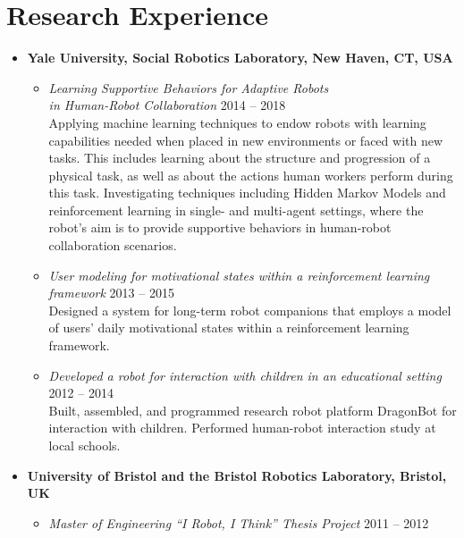 \documentclass[10pt,letterpaper]{article}
\newcommand{\thing}[2]{{#1} \hfill {#2}}
\begin{document}
\section{Research Experience}
\begin{itemize}%
\item {\bf Yale University, Social Robotics Laboratory, New Haven, CT, USA}\\
	\begin{itemize}\setlength\itemsep{0.8em}\vspace{-1em}
	\item \thing{\it Learning Supportive Behaviors for Adaptive Robots \\ in Human-Robot Collaboration}{2014 -- 2018}\vspace{0.1em}\\
	Applying machine learning techniques to endow robots with learning capabilities needed when placed in new environments or faced with new tasks. This includes learning about the structure and progression of a physical task, as well as about the actions human workers perform during this task. Investigating techniques including Hidden Markov Models and reinforcement learning in single- and multi-agent settings, where the robot's aim is to provide supportive behaviors in human-robot collaboration scenarios.
	\item \thing{\it User modeling for motivational states within a reinforcement learning framework}{2013 -- 2015}\vspace{0.1em}\\
	Designed a system for long-term robot companions that employs a model of users' daily motivational states within a reinforcement learning framework.
	\item \thing{\it Developed a robot for interaction with children in an educational setting}{2012 -- 2014}\vspace{0.1em}\\
	 Built, assembled, and programmed research robot platform DragonBot for interaction with children. Performed human-robot interaction study at local schools.
	\end{itemize}
\item {\bf University of Bristol and the Bristol Robotics Laboratory, Bristol, UK}\\
	\begin{itemize}\setlength\itemsep{0.8em}\vspace{-1em}
	\item \thing{\it Master of Engineering ``I Robot, I Think'' Thesis Project}{2011 -- 2012}\vspace{0.1em}\\

\end{itemize}
\end{itemize}
\end{document}
